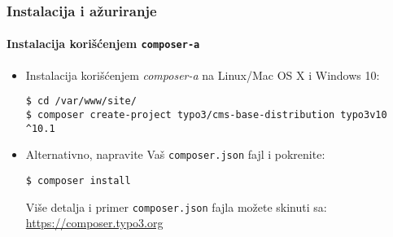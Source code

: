 
\begin{frame}[fragile]
	\frametitle{Instalacija i ažuriranje}
	\framesubtitle{Instalacija korišćenjem \texttt{composer-a}}

	\begin{itemize}
		\item Instalacija korišćenjem \textit{composer-a} na Linux/Mac OS X i Windows 10:

			\begin{lstlisting}
$ cd /var/www/site/
$ composer create-project typo3/cms-base-distribution typo3v10 ^10.1
			\end{lstlisting}

		\item Alternativno, napravite Vaš \texttt{composer.json} fajl i pokrenite:

			\begin{lstlisting}
$ composer install
			\end{lstlisting}

			Više detalja i primer \texttt{composer.json} fajla možete skinuti sa:\newline
			\smaller
				\href{https://composer.typo3.org}{https://composer.typo3.org}
			\normalsize

	\end{itemize}
\end{frame}

